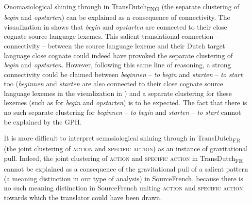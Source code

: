 Onomasiological shining through in TransDutch\textsubscript{ENG} (the separate clustering of \textit{begin} and \textit{opstarten}) can be explained as a consequence of connectivity. The visualization in  shows that \textit{begin} and \textit{opstarten} are connected to their close cognate source language lexemes. This salient translational connection – connectivity – between the source language lexeme and their Dutch target language close cognate could indeed have provoked the separate clustering of \textit{begin} and \textit{opstarten}. However, following this same line of reasoning, a strong connectivity could be claimed between \textit{beginnen} – \textit{to} \textit{begin} and \textit{starten} – \textit{to start} too (\textit{beginnen} and \textit{starten} are also connected to their close cognate source language lexemes in the visualization in ) and a separate clustering for these lexemes (such as for \textit{begin} and \textit{opstarten}) is to be expected. The fact that there is no such separate clustering for \textit{beginnen} -- \textit{to begin} and \textit{starten} -- \textit{to start} cannot be explained by the GPH.

It is more difficult to interpret semasiological shining through in TransDutch\textsubscript{FR} (the joint clustering of \textsc{action} and \textsc{specific} \textsc{action}) as an instance of gravitational pull. Indeed, the joint clustering of \textsc{action} and \textsc{specific} \textsc{action} in TransDutch\textsubscript{FR} cannot be explained as a consequence of the gravitational pull of a salient pattern (a meaning distinction in our type of analysis) in SourceFrench, because there is no such meaning distinction in SourceFrench uniting \textsc{action} and \textsc{specific} \textsc{action} towards which the translator could have been drawn.

